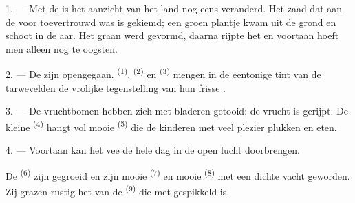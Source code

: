 %


\VUsaut{5.0mm}
\VUsaut{3.0mm}
\VUsaut{3.0mm}
\VUsaut{4.0mm}
\VUsaut{3.0mm}

1. --- Met de  is het aanzicht van het land nog eens veranderd. Het zaad dat aan
de voor toevertrouwd was is gekiemd; een groen plantje kwam uit de grond en schoot in de aar.
Het graan werd gevormd, daarna rijpte het en voortaan hoeft men alleen nog te oogsten.

2. --- De  zijn opengegaan.  \textsuperscript{(1)},
 \textsuperscript{(2)} en
 \textsuperscript{(3)} mengen in de eentonige tint van
de tarwevelden de vrolijke tegenstelling van hun frisse .

3. --- De vruchtbomen hebben zich met bladeren getooid; de vrucht is gerijpt. De kleine
 \textsuperscript{(4)} hangt vol mooie
 \textsuperscript{(5)} die de kinderen met veel plezier plukken
en eten.

4. --- Voortaan kan het vee de hele dag in de open lucht doorbrengen.

De  \textsuperscript{(6)} zijn gegroeid en zijn mooie
 \textsuperscript{(7)} en mooie 
\textsuperscript{(8)} met een dichte vacht geworden. Zij grazen rustig het
 van de  \textsuperscript{(9)} die met
 gespikkeld is.

